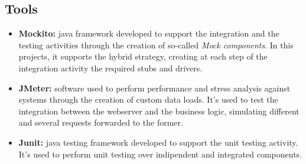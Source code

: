 \subsection{Tools}

\begin{itemize}
	\item \textbf{Mockito:} java framework developed to support the integration and the testing activities through the creation of so-called \textit{Mock components}. In this projects, it supports the hybrid strategy, creating at each step of the integration activity the required stubs and drivers.

	\item \textbf{JMeter:} software used to perform performance and stress analysis against systems through the creation of custom data loads.
It's used to test the integration between the webserver and the business logic, simulating different and several requests forwarded to the former.

	\item \textbf{Junit:} java testing framework developed to support the unit testing activity. It's used to perform unit testing over indipendent and integrated components. 
\end{itemize}
